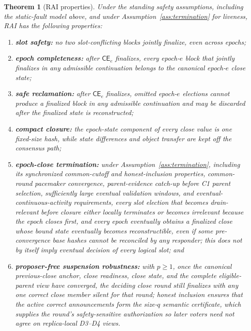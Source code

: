 \documentclass[11pt]{article}
\newtheorem{theorem}{Theorem}
\theoremstyle{definition}
\theoremstyle{remark}
\newcommand{\CE}{\mathsf{CE}}
\begin{document}
\begin{theorem}[RAI properties]
\label{thm:rai-properties}
Under the standing safety assumptions, including the static-fault model above, and under Assumption~\ref{ass:termination} for liveness, RAI has the following properties:
\begin{enumerate}[leftmargin=2.0em]
  \item \textbf{slot safety:} no two slot-conflicting blocks jointly finalize, even across epochs;
  \item \textbf{epoch completeness:} after $\CE_e$ finalizes, every epoch-$e$ block that jointly finalizes in any admissible continuation belongs to the canonical epoch-$e$ close state;
  \item \textbf{safe reclamation:} after $\CE_e$ finalizes, omitted epoch-$e$ elections cannot produce a finalized block in any admissible continuation and may be discarded after the finalized state is reconstructed;
  \item \textbf{compact closure:} the epoch-state component of every close value is one fixed-size hash, while state differences and object transfer are kept off the consensus path;
  \item \textbf{epoch-close termination:} under Assumption~\ref{ass:termination}, including its synchronized common-cutoff and honest-inclusion properties, common-round pacemaker convergence, parent-evidence catch-up before C1 parent selection, sufficiently large eventual validation windows, and eventual-continuous-activity requirements, every slot election that becomes drain-relevant before closure either locally terminates or becomes irrelevant because the epoch closes first, and every epoch eventually obtains a finalized close whose bound state eventually becomes reconstructible, even if some pre-convergence base hashes cannot be reconciled by any responder; this does not by itself imply eventual decision of every logical slot; and
  \item \textbf{proposer-free suspension robustness:} with $p\ge1$, once the canonical previous-close anchor, close readiness, close state, and the complete eligible-parent view have converged, the deciding close round still finalizes with any one correct close member silent for that round; honest inclusion ensures that the active correct announcements form the size-$q$ semantic certificate, which supplies the round's safety-sensitive authorization so later voters need not agree on replica-local D3--D4 views.
\end{enumerate}
\end{theorem}
\end{document}
